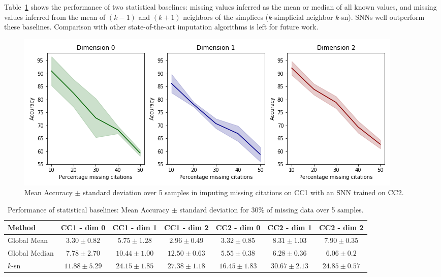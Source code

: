 Table~\ref{table:comparison-SNN} shows the performance of two statistical baselines: missing values inferred as the mean or median of all known values, and missing values inferred from the mean of $(k-1)$ and $(k+1)$ neighbors of the simplices ($k$-simplicial neighbor $k$-sn). SNNs well outperform these baselines.
Comparison with other state-of-the-art imputation algorithms is left for future work.

\begin{figure}[htbp]
  \centering
\includegraphics[scale=0.35]{./figures/accuracy_network1_pretrained.png}
  \caption{Mean Accuracy $\pm$ standard deviation over 5 samples in imputing missing citations on CC1 with an SNN trained on CC2.} \label{fig:transfer-learning}
\end{figure}

\begin{table}[htbp]
  \centering
  \scriptsize{
  \begin{tabular}{lcccccc}
    \toprule
    Method   & CC1 - dim 0   & CC1 - dim 1   & CC1 - dim 2   & CC2 - dim 0  & CC2 - dim 1  & CC2 - dim 2 \\
    \midrule
   Global Mean & $3.30 \pm 0.82$ & $5.75\pm 1.28$  &$ 2.96\pm 0.49$  & $3.32 \pm 0.85$ & $8.31 \pm 1.03$  & $7.90\pm 0.35$\\
    Global Median & $7.78 \pm 2.70$   & $10.44 \pm 1.00$ &$ 12.50 \pm 0.63 $ & $5.55 \pm 0.38 $&$ 6.28\pm 0.36  $&$ 6.06\pm 0.2$\\
    $k$-sn & $11.88\pm 5.29 $& $24.15 \pm 1.85$ & $27.38 \pm 1.18  $& $16.45 \pm 1.83 $&$ 30.67\pm 2.13$   &$ 24.85 \pm 0.57 $\\
    \bottomrule
  \end{tabular}}
   \vspace{2pt}
  \caption{%
      Performance of statistical baselines: Mean Accuracy $\pm$ standard deviation for $30\%$ of missing data over 5 samples.
  }\label{table:comparison-SNN}
\end{table}%
